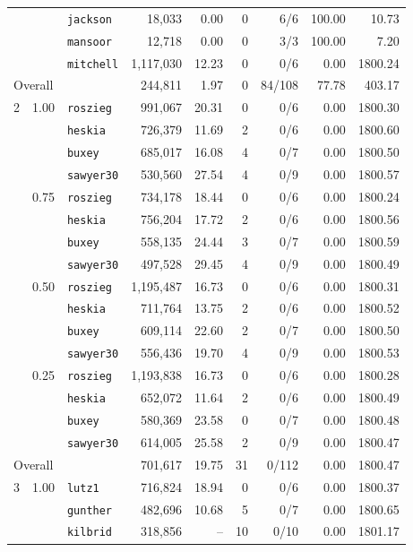 \begin{table}[tpb]
\begin{tabular}{cclrrrrrr}
		&		& {\tt jackson}	& 18,033 & 0.00 & 0 & 6/6 & 100.00 & 10.73 \\
		&		& {\tt mansoor}	& 12,718 & 0.00 & 0 & 3/3 & 100.00 & 7.20 \\
		&		& {\tt mitchell}	& 1,117,030 & 12.23 & 0 & 0/6 & 0.00 & 1800.24 \\[1mm]
		\multicolumn{2}{l}{Overall} & & 244,811 & 1.97 & 0 & 84/108 & 77.78 & 403.17 \\\midrule
		2 & 1.00 & {\tt roszieg}	& 991,067 & 20.31 & 0 & 0/6 & 0.00 & 1800.30 \\
		&		& {\tt heskia}	& 726,379 & 11.69 & 2 & 0/6 & 0.00 & 1800.60 \\
		&		& {\tt buxey}	& 685,017 & 16.08 & 4 & 0/7 & 0.00 & 1800.50 \\
		&		& {\tt sawyer30}	& 530,560 & 27.54 & 4 & 0/9 & 0.00 & 1800.57 \\
		& 0.75	& {\tt roszieg}	& 734,178 & 18.44 & 0 & 0/6 & 0.00 & 1800.24 \\
		&		& {\tt heskia}	& 756,204 & 17.72 & 2 & 0/6 & 0.00 & 1800.56 \\
		&		& {\tt buxey}	& 558,135 & 24.44 & 3 & 0/7 & 0.00 & 1800.59 \\
		&		& {\tt sawyer30}	& 497,528 & 29.45 & 4 & 0/9 & 0.00 & 1800.49 \\
		& 0.50	& {\tt roszieg}	& 1,195,487 & 16.73 & 0 & 0/6 & 0.00 & 1800.31 \\
		&		& {\tt heskia}	& 711,764 & 13.75 & 2 & 0/6 & 0.00 & 1800.52 \\
		&		& {\tt buxey}	& 609,114 & 22.60 & 2 & 0/7 & 0.00 & 1800.50 \\
		&		& {\tt sawyer30}	& 556,436 & 19.70 & 4 & 0/9 & 0.00 & 1800.53 \\
		& 0.25	& {\tt roszieg}	& 1,193,838 & 16.73 & 0 & 0/6 & 0.00 & 1800.28 \\
		&		& {\tt heskia}	& 652,072 & 11.64 & 2 & 0/6 & 0.00 & 1800.49 \\
		&		& {\tt buxey}	& 580,369 & 23.58 & 0 & 0/7 & 0.00 & 1800.48 \\
		&		& {\tt sawyer30}	& 614,005 & 25.58 & 2 & 0/9 & 0.00 & 1800.47 \\[1mm]
		\multicolumn{2}{l}{Overall} & & 701,617 & 19.75 & 31 & 0/112 & 0.00 & 1800.47 \\\midrule
		3 & 1.00 & {\tt lutz1}	& 716,824 & 18.94 & 0 & 0/6 & 0.00 & 1800.37 \\
		&		& {\tt gunther}	& 482,696 & 10.68 & 5 & 0/7 & 0.00 & 1800.65 \\
		&		& {\tt kilbrid}	& 318,856 & -- & 10 & 0/10 & 0.00 & 1801.17 \\

\end{tabular}
\end{table}
